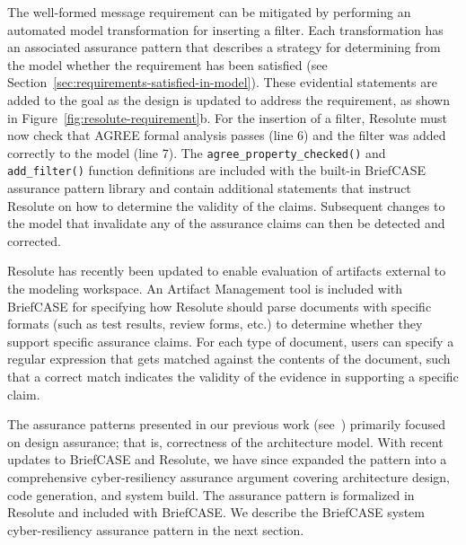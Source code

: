 The well-formed message requirement can be mitigated by performing an automated model transformation for inserting a filter. Each transformation has an associated assurance pattern that describes a strategy for determining from the model whether the requirement has been satisfied (see Section~\ref{sec:requirements-satisfied-in-model}).  
These evidential statements are added to the goal as the design is updated to address the requirement, as shown in Figure~\ref{fig:resolute-requirement}b.  For the insertion of a filter, Resolute must now check that AGREE formal analysis passes (line 6) and the filter was added correctly to the model (line 7).  The \texttt{agree\_property\_checked()} and \texttt{add\_filter()} function definitions are included with the built-in BriefCASE assurance pattern library and contain additional statements that instruct Resolute on how to determine the validity of the claims. 
Subsequent changes to the model that invalidate any of the assurance claims can then be detected and corrected.  

Resolute has recently been updated to enable evaluation of artifacts external to the modeling workspace. An Artifact Management tool is included with BriefCASE for specifying how Resolute should parse documents with specific formats (such as test results, review forms, etc.) to determine whether they support specific assurance claims.  For each type of document, users can specify a regular expression that gets matched against the contents of the document, such that a correct match indicates the validity of the evidence in supporting a specific claim.

The assurance patterns presented in our previous work (see~\cite{resolute-destion}) primarily focused on design assurance; that is, correctness of the architecture model.  With recent updates to BriefCASE and Resolute, we have since expanded the pattern into a comprehensive cyber-resiliency assurance argument covering architecture design, code generation, and system build.  The assurance pattern is formalized in Resolute and included with BriefCASE.
%
We describe the BriefCASE system cyber-resiliency assurance pattern in the next section.

